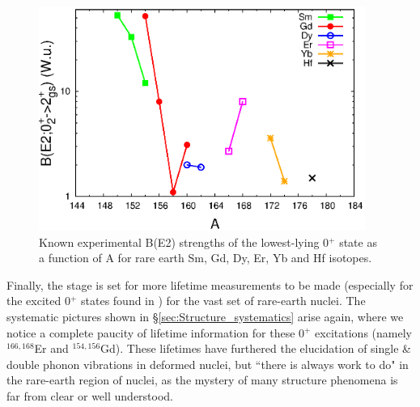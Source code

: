 \begin{figure}[h!]
\begin{center}
\includegraphics[width=0.95\textwidth]{figures/Rare_Earth_02_BE2.eps}
\end{center}
\caption{Known experimental B(E2) strengths of the lowest-lying 0$^+$ state as a function of A for rare earth Sm, Gd, Dy, Er, Yb and Hf isotopes. \label{fig:Rare_earth_02_BE2}}
\end{figure}

Finally, the stage is set for more lifetime measurements to be made (especially for the excited 0$^+$ states found in \cite{Meyer_pt0_2006}) for the vast set of rare-earth nuclei. The systematic pictures shown in \S \ref{sec:Structure_systematics} arise again, where we notice a complete paucity of lifetime information for these 0$^+$ excitations (namely $^{166,168}$Er and $^{154,156}$Gd). These lifetimes have furthered the elucidation of single \& double phonon vibrations in deformed nuclei, but ``there is always work to do" in the rare-earth region of nuclei, as the mystery of many structure phenomena is far from clear or well understood.
